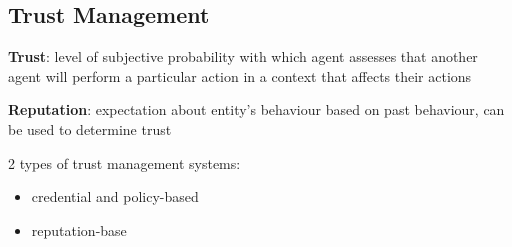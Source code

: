 \documentclass[11pt]{article}
\begin{document}
\subsection{Trust Management}
\label{sec:org2d41dc4}
\textbf{Trust}: level of subjective probability with which agent assesses
that another agent will perform a particular action in a context that affects their
actions

\textbf{Reputation}: expectation about entity's behaviour based on past behaviour, can be
used to determine trust

2 types of trust management systems:
\begin{itemize}
\item credential and policy-based
\item reputation-base
\end{itemize}
\end{document}
